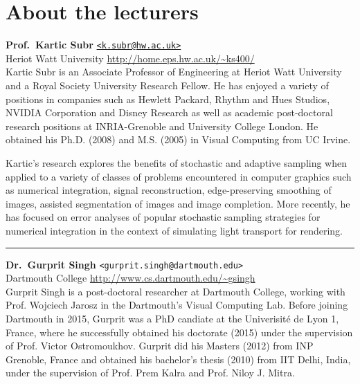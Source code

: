 \documentclass[11pt,fleqn]{book} %
\begin{document}
{}
\section*{About the lecturers}

\noindent\textbf{Prof.\ Kartic Subr} \hfill
\href{<k.subr@hw.ac.uk>}{\texttt{<k.subr@hw.ac.uk>}} \\
Heriot Watt University\hfill
\url{http://home.eps.hw.ac.uk/~ks400/}\\

Kartic Subr is an Associate Professor of Engineering at Heriot Watt University and a Royal Society University Research Fellow. He has enjoyed a variety of positions in companies such as Hewlett Packard, Rhythm and Hues Studios, NVIDIA Corporation and Disney Research as well as academic post-doctoral research positions at INRIA-Grenoble and University College London. He obtained his Ph.D. (2008) and M.S. (2005) in Visual Computing from UC Irvine. 

Kartic's research explores the benefits of stochastic and adaptive sampling when applied to a variety of classes of problems encountered in computer graphics such as numerical integration, signal reconstruction, edge-preserving smoothing of images, assisted segmentation of images and image completion. More recently, he has focused on error analyses of popular stochastic sampling strategies for numerical integration in the context of simulating light transport for rendering.

\medskip
\textcolor[RGB]{220,220,220}{\rule{.9\columnwidth}{0.5pt}}
\medskip

\noindent\textbf{Dr.\ Gurprit Singh} \hfill
{\texttt{<gurprit.singh@dartmouth.edu>}} \href{mailto:gurprit.singh@dartmouth.edu}\\
Dartmouth College\hfill
\url{http://www.cs.dartmouth.edu/~gsingh}\\

Gurprit Singh is a post-doctoral researcher at Dartmouth College, working with Prof. Wojciech Jarosz in the Dartmouth's Visual Computing Lab. Before joining Dartmouth in 2015, Gurprit was a PhD candiate 
at the Univerisit\'{e} de Lyon 1, France, where he successfully obtained his doctorate (2015) under the 
supervision of Prof. Victor Ostromoukhov. Gurprit did his Masters (2012) from INP Grenoble, France and 
obtained his bachelor's thesis (2010) from IIT Delhi, India, under the supervision of Prof. Prem Kalra and Prof. Niloy J. Mitra.
\end{document}
